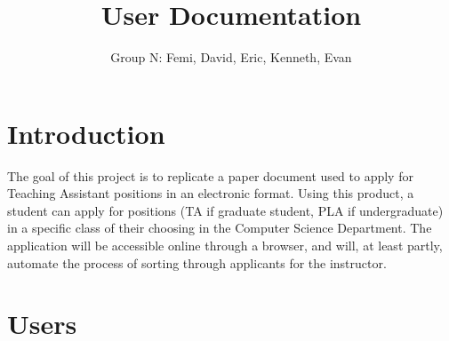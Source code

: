 \documentclass[11pt]{amsart}
\title{User Documentation}
\author{Group N: Femi, David, Eric, Kenneth, Evan}
\begin{document}
\maketitle
\section{Introduction}
\noindent The goal of this project is to replicate a paper document used to apply for Teaching Assistant positions in an electronic format. Using this product, a student can apply for positions (TA if graduate student, PLA if undergraduate) in a specific class of their choosing in the Computer Science Department. The application will be accessible online through a browser, and will, at least partly, automate the process of sorting through applicants for the instructor.
\section{Users}
\end{document}
